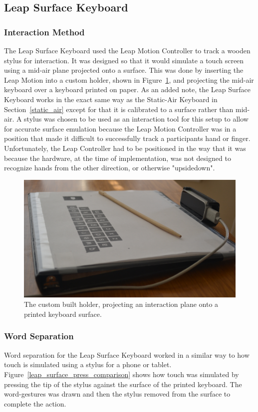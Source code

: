 \subsection{Leap Surface Keyboard} \label{leap_surface}
\subsubsection{Interaction Method}
The Leap Surface Keyboard used the Leap Motion Controller to track a wooden stylus for interaction. It was designed so that it would simulate a touch screen using a mid-air plane projected onto a surface. This was done by inserting the Leap Motion into a custom holder, shown in Figure~\ref{fig_leap_holder}, and projecting the mid-air keyboard over a keyboard printed on paper. As an added note, the Leap Surface Keyboard works in the exact same way as the Static-Air Keyboard in Section~\ref{static_air} except for that it is calibrated to a surface rather than mid-air. A stylus was chosen to be used as an interaction tool for this setup to allow for accurate surface emulation because the Leap Motion Controller was in a position that made it difficult to successfully track a participants hand or finger. Unfortunately, the Leap Controller had to be positioned in the way that it was because the hardware, at the time of implementation, was not designed to recognize hands from the other direction, or otherwise "upsidedown".

\begin{figure}[h]
	\centering
	\includegraphics[width=5in]{fig_leap_holder}
	\caption[Leap Surface Holder]{The custom built holder, projecting an interaction plane onto a printed keyboard surface.}
	\label{fig_leap_holder}
\end{figure}

\subsubsection{Word Separation}
Word separation for the Leap Surface Keyboard worked in a similar way to how touch is simulated using a stylus for a phone or tablet. Figure~\ref{leap_surface_press_comparison} shows how touch was simulated by pressing the tip of the stylus against the surface of the printed keyboard. The word-gestures was drawn and then the stylus removed from the surface to complete the action.

